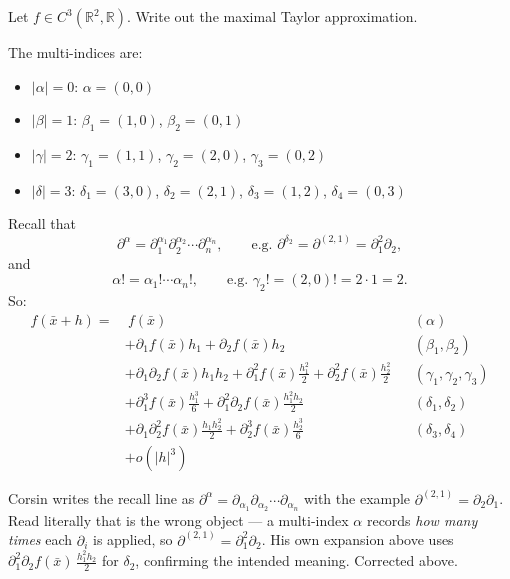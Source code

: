 \begin{exercise}
\label{ex:taylor_maximal_expansion}
Let $f \in C^3(\mathbb{R}^2,\mathbb{R})$. Write out the maximal Taylor approximation.
\end{exercise}

\begin{exercisesolution}
The multi-indices are:
\begin{itemize}
  \item $|\alpha| = 0$: $\alpha = (0,0)$
  \item $|\beta| = 1$: $\beta_1 = (1,0)$, $\beta_2 = (0,1)$
  \item $|\gamma| = 2$: $\gamma_1 = (1,1)$, $\gamma_2 = (2,0)$, $\gamma_3 = (0,2)$
  \item $|\delta| = 3$: $\delta_1 = (3,0)$, $\delta_2 = (2,1)$, $\delta_3 = (1,2)$, $\delta_4 = (0,3)$
\end{itemize}
Recall that
\[\partial^\alpha = \partial_1^{\alpha_1}\partial_2^{\alpha_2}\cdots\partial_n^{\alpha_n}, \qquad \text{e.g.\ } \partial^{\delta_2} = \partial^{(2,1)} = \partial_1^2\partial_2,\]
and
\[\alpha! = \alpha_1!\cdots\alpha_n!, \qquad \text{e.g.\ } \gamma_2! = (2,0)! = 2\cdot 1 = 2.\]
So:
\[
\begin{aligned}
f(\bar x + h) = &\ f(\bar x) && (\alpha) \\
&+ \partial_1 f(\bar x)h_1 + \partial_2 f(\bar x)h_2 && (\beta_1, \beta_2)\\
&+ \partial_1\partial_2 f(\bar x)h_1h_2 + \partial_1^2 f(\bar x)\frac{h_1^2}{2} + \partial_2^2 f(\bar x)\frac{h_2^2}{2} && (\gamma_1, \gamma_2, \gamma_3)\\
&+ \partial_1^3 f(\bar x)\frac{h_1^3}{6} + \partial_1^2\partial_2 f(\bar x)\frac{h_1^2h_2}{2} && (\delta_1, \delta_2)\\
&+ \partial_1\partial_2^2 f(\bar x)\frac{h_1h_2^2}{2} + \partial_2^3 f(\bar x)\frac{h_2^3}{6} && (\delta_3, \delta_4)\\
&+ o(|h|^3)
\end{aligned}
\]
\end{exercisesolution}

\begin{ainote}
Corsin writes the recall line as
$\partial^\alpha = \partial_{\alpha_1}\partial_{\alpha_2}\cdots\partial_{\alpha_n}$ with the
example $\partial^{(2,1)} = \partial_2\partial_1$. Read literally that is the wrong object --- a
multi-index $\alpha$ records \textit{how many times} each $\partial_i$ is applied, so
$\partial^{(2,1)} = \partial_1^2\partial_2$. His own expansion above uses
$\partial_1^2\partial_2 f(\bar x)\,\tfrac{h_1^2h_2}{2}$ for $\delta_2$, confirming the intended
meaning. Corrected above.
\end{ainote}

